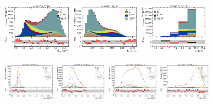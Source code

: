 \begin{figure}[!htb]
    \centering
    \includegraphics[width=0.32\textwidth]{./figs-fit-fit-results/ctrl-fit/stacked/fit_result-stacked-D0-dd-mmiss2.pdf}
    \includegraphics[width=0.32\textwidth]{./figs-fit-fit-results/ctrl-fit/stacked/fit_result-stacked-D0-dd-el.pdf}
    \includegraphics[width=0.32\textwidth]{./figs-fit-fit-results/ctrl-fit/stacked/fit_result-stacked-D0-dd-q2.pdf}

    \includegraphics[width=0.24\textwidth]{./figs-fit-fit-results/ctrl-fit/lines_q2_slices/fit_result-lines_q2_idx1-D0-dd-mmiss2.pdf}
    \includegraphics[width=0.24\textwidth]{./figs-fit-fit-results/ctrl-fit/lines_q2_slices/fit_result-lines_q2_idx2-D0-dd-mmiss2.pdf}
    \includegraphics[width=0.24\textwidth]{./figs-fit-fit-results/ctrl-fit/lines_q2_slices/fit_result-lines_q2_idx3-D0-dd-mmiss2.pdf}
    \includegraphics[width=0.24\textwidth]{./figs-fit-fit-results/ctrl-fit/lines_q2_slices/fit_result-lines_q2_idx4-D0-dd-mmiss2.pdf}


\end{figure}
